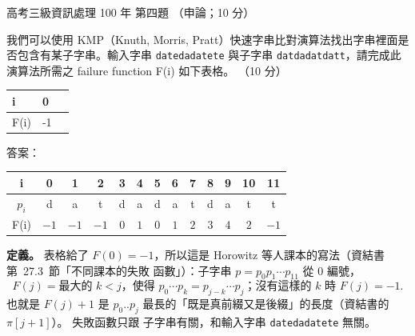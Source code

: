 \begin{pastexam}[label={px:gk3-100-ds-04}]{高考三級資訊處理 100 年 第四題}
（申論；10 分）

我們可以使用 KMP（Knuth, Morris, Pratt）快速字串比對演算法找出字串裡面是否包含有某子字串。輸入字串
\texttt{datedadatete} 與子字串 \texttt{datdadatdatt}，請完成此演算法所需之 failure function F(i) 如下表格。
（10 分）
\begin{center}
\begin{tabular}{|l|l|l}
\hline
i & 0 & \\ \hline
F(i) & -1 & \\ \hline
\end{tabular}
\end{center}
\end{pastexam}

\begin{pastsoln}
答案：
\begin{center}
\begin{tabular}{|c|*{12}{c|}}
\hline
i & 0 & 1 & 2 & 3 & 4 & 5 & 6 & 7 & 8 & 9 & 10 & 11 \\ \hline
$p_i$ & d & a & t & d & a & d & a & t & d & a & t & t \\ \hline
F(i) & $-1$ & $-1$ & $-1$ & $0$ & $1$ & $0$ & $1$ & $2$ & $3$ & $4$ & $2$ & $-1$ \\ \hline
\end{tabular}
\end{center}

\textbf{定義。} 表格給了 $F(0) = -1$，所以這是 Horowitz 等人課本的寫法（資結書第~27.3~節「不同課本的失敗
函數」）：子字串 $p = p_0 p_1 \cdots p_{11}$ 從 $0$ 編號，
\[
F(j) = \text{最大的 } k < j \text{，使得 } p_0 \cdots p_k = p_{j-k} \cdots p_j\text{；沒有這樣的 } k \text{ 時 } F(j) = -1.
\]
也就是 $F(j) + 1$ 是 $p_0..p_j$ 最長的「既是真前綴又是後綴」的長度（資結書的 $\pi[j+1]$）。 失敗函數只跟
子字串有關，和輸入字串 \texttt{datedadatete} 無關。


\end{pastsoln}
